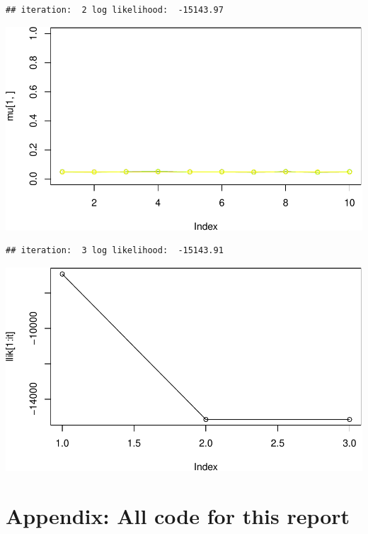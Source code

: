 \documentclass[
]{article}
\begin{document}
\begin{verbatim}
## iteration:  2 log likelihood:  -15143.97
\end{verbatim}

\includegraphics{Lab1Block2_files/figure-latex/unnamed-chunk-1-14.pdf}

\begin{verbatim}
## iteration:  3 log likelihood:  -15143.91
\end{verbatim}

\includegraphics{Lab1Block2_files/figure-latex/unnamed-chunk-1-15.pdf}

\newpage

\hypertarget{appendix-all-code-for-this-report}{%
\section{Appendix: All code for this
report}\label{appendix-all-code-for-this-report}}
\end{document}
